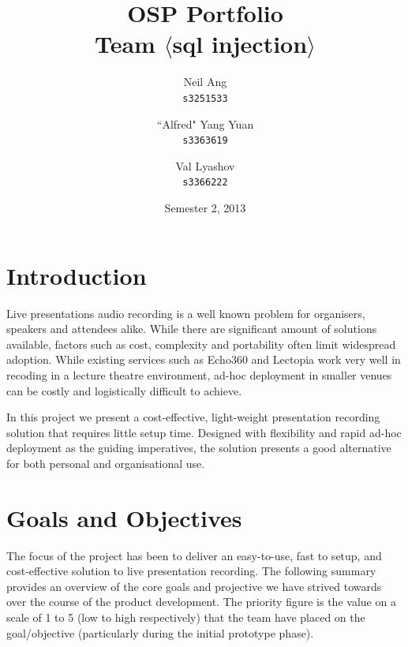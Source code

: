 \documentclass[11pt,a4paper,titlepage]{report}
\title{OSP Portfolio \\ Team $\langle$sql injection$\rangle$}
\author{
  Neil Ang\\
  \texttt{s3251533}
  \and
  ``Alfred" Yang Yuan\\
  \texttt{s3363619}
  \and
  Val Lyashov\\
  \texttt{s3366222}
}
\date{Semester 2, 2013}
\begin{document}
\maketitle

\pagebreak
\tableofcontents
\thispagestyle{empty}
\pagebreak

\section{Introduction}

Live presentations audio recording is a well known problem for organisers, speakers and attendees alike. While there are significant amount of solutions available, factors such as cost, complexity and portability often limit widespread adoption. While existing services such as Echo360 and Lectopia work very well in recoding in a lecture theatre environment, ad-hoc deployment in smaller venues can be costly and logistically difficult to achieve.
 
In this project we present a cost-effective, light-weight presentation recording solution that requires little setup time. Designed with flexibility and rapid ad-hoc deployment as the guiding imperatives, the solution presents a good alternative for both personal and organisational use.


\section{Goals and Objectives}


The focus of the project has been to deliver an easy-to-use, fast to setup, and cost-effective solution to live presentation recording. The following summary provides an overview of the core goals and projective we have strived towards over the course of the product development. The priority figure is the value on a scale of 1 to 5 (low to high respectively) that the team have placed on the goal/objective (particularly during the initial prototype phase).
\end{document}
